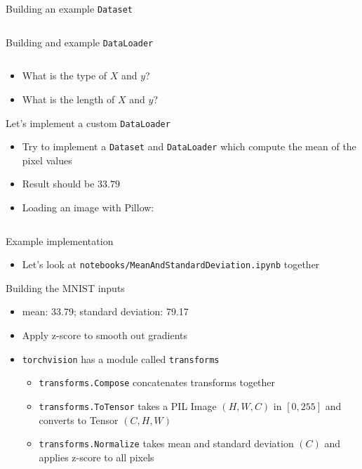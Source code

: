 \documentclass[hyperref={pdfpagelabels=false},12pt]{beamer}
\newcommand{\code}[2]{\texttt{#2}}
\newcommand{\python}[1]{\code{python}{#1}}
\newcommand{\pygment}[3]{\inputminted[bgcolor=lightgray,linenos,fontsize=#1]{#2}{#3}}
\begin{document}
\begin{frame}{Building an example \python{Dataset}}
  \pygment{\scriptsize}{python}{code/basic-dataset.py}
\end{frame}

\begin{frame}{Building and example \python{DataLoader}}
  \pygment{\scriptsize}{python}{code/basic-dataloader.py}
  \vspace{-0.5cm}
  \begin{itemize}
    \item What is the type of $X$ and $y$?
    \item What is the length of $X$ and $y$?
  \end{itemize}
\end{frame}

\begin{frame}{Let's implement a custom \python{DataLoader}}
  \begin{itemize}
    \item Try to implement a \python{Dataset} and \python{DataLoader} which
      compute the mean of the pixel values
    \item Result should be $33.79$
    \item Loading an image with Pillow:
  \end{itemize}
  \pygment{\scriptsize}{python}{code/pil-open.py}
\end{frame}

\begin{frame}{Example implementation}
  \begin{itemize}
    \item Let's look at \texttt{notebooks/MeanAndStandardDeviation.ipynb} together
  \end{itemize}
\end{frame}

\begin{frame}{Building the MNIST inputs}
  \begin{itemize}
    \item mean: 33.79; standard deviation: 79.17
    \item Apply z-score to smooth out gradients
    \item \texttt{torchvision} has a module called \texttt{transforms}
    \begin{itemize}
      \item \python{transforms.Compose} concatenates transforms together
      \item \python{transforms.ToTensor} takes a PIL Image $(H, W, C)$
        in $[0, 255]$ and converts to Tensor $(C, H, W)$
      \item \python{transforms.Normalize} takes mean and standard deviation
        $(C)$ and applies z-score to all pixels
    \end{itemize}
  \end{itemize}
\end{frame}
\end{document}
